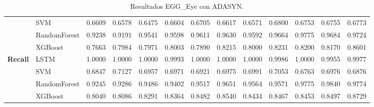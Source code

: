 \begin{table}[h]
\begin{adjustbox}{max width=15cm}
\begin{tabular}{|c|l|r|r|r|r|r|r|r|r|r|r|r|}
			& SVM &  0.6609 &  0.6578 &  0.6475 &  0.6604 &  0.6705 &  0.6617 &  0.6571 &  0.6800 &  0.6753 &  0.6755 &  0.6773 \\
			& RandomForest &  0.9238 &  0.9191 &  0.9541 &  0.9598 &  0.9611 &  0.9630 &  0.9592 &  0.9664 &  0.9775 &  0.9684 &  0.9724 \\
			& XGBoost &  0.7663 &  0.7984 &  0.7971 &  0.8003 &  0.7890 &  0.8215 &  0.8000 &  0.8231 &  0.8200 &  0.8170 &  0.8601 \\
			\hline
			\textbf{Recall}& LSTM &  1.0000 &  1.0000 &  1.0000 &  0.9993 &  1.0000 &  1.0000 &  1.0000 &  0.9986 &  1.0000 &  0.9955 &  0.9977 \\
			& SVM &  0.6847 &  0.7127 &  0.6957 &  0.6971 &  0.6921 &  0.6975 &  0.6991 &  0.7053 &  0.6763 &  0.6976 &  0.6876 \\
			& RandomForest &  0.9245 &  0.9286 &  0.9486 &  0.9402 &  0.9517 &  0.9651 &  0.9564 &  0.9571 &  0.9775 &  0.9840 &  0.9774 \\
			& XGBoost &  0.8040 &  0.8086 &  0.8291 &  0.8364 &  0.8482 &  0.8540 &  0.8434 &  0.8467 &  0.8453 &  0.8497 &  0.8729 \\
			\hline
		\end{tabular}
	\end{adjustbox}
	\label{tab:EGGEyeADASYN}
	\caption{Resultados EGG\_Eye con ADASYN.}
\end{table}
